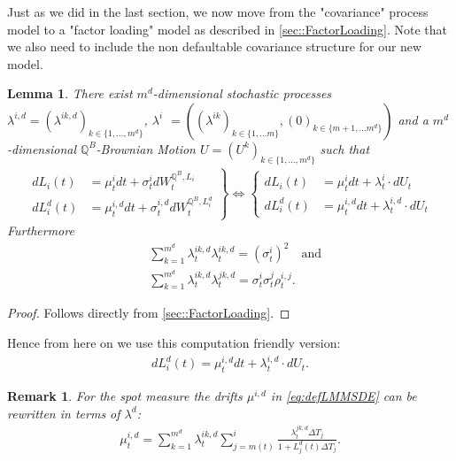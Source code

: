 \documentclass[12pt]{article}
\newtheorem{lemma}[theorem]{Lemma}
\newtheorem{remark}[theorem]{Remark}
\begin{document}
	Just as we did in the last section, we now move from the "covariance" process model to a "factor loading" model as described in \cref{sec::FactorLoading}. Note that we also need to include the non defaultable covariance structure for our new model.\\
	\begin{lemma}\label{lem:defLMMFactorVersion}
		There exist $m^d$-dimensional stochastic processes $\lambda^{i,d} = (\lambda^{i k, d})_{k \in \{1, ..., m^d\}}$, $\lambda^{i}$ $= ((\lambda^{i k})_{k \in \{1, ... m\}}, (0)_{k \in \{m+1, ... m^d\}})$ and a $m^d $-dimensional $\mathbb{Q}^B$-Brownian Motion $U=(U^k)_{k \in \{1,...,m^d\}}$ such that
		\begin{align*}
			\left.
			\begin{aligned}
				dL_i(t) &= \mu^{i}_t dt + \sigma^{i}_t dW^{\mathbb{Q}^B, L_i}_t\\
				dL^d_i(t) &= \mu^{i, d}_t dt + \sigma^{i, d}_t dW^{\mathbb{Q}^B, L^d_i}_t
			\end{aligned}
			\right\}
			 \iff 
			 \left\{
			 \begin{aligned}
			 	dL_i(t) &= \mu^{i}_t dt + \lambda^{i}_t\cdot dU_t\\
			 	dL^d_i(t) &= \mu^{i, d}_t dt + \lambda^{i,d}_t\cdot dU_t
			 \end{aligned}
			 \right.
		\end{align*}
		Furthermore
		\begin{align*}
			&\sum_{k=1}^{m^d}\lambda^{i k, d}_t \lambda^{i k, d}_t = (\sigma^i_t)^2 \quad\text{and}\\
			&\sum_{k=1}^{m^d}\lambda^{i k, d}_t \lambda^{j k, d}_t = \sigma^i_t \sigma^j_t \rho^{i,j}_t.
		\end{align*}
	\end{lemma}
	\begin{proof}
		Follows directly from \cref{sec::FactorLoading}. %
	\end{proof}
	Hence from here on we use this computation friendly version:
	\begin{align}\label{eq:defLMMSDE}
			dL^d_i(t) = \mu^{i, d}_t dt + \lambda^{i,d}_t\cdot dU_t.
	\end{align}
	\begin{remark}\label{rem:defLMMDrift}
		For the spot measure the drifts $\mu^{i,d}$ in \cref{eq:defLMMSDE} can be rewritten in terms of $\lambda^{d}$:
		\begin{align*}
			\mu^{i,d}_t = \sum_{k=1}^{m^d}\lambda^{i k, d}_t \sum_{j=m(t)}^{i}\frac{\lambda^{j k, d}_t\Delta T_j}{1 + L^d_j(t)\Delta T_j}.
		\end{align*}
	\end{remark}
\end{document}
